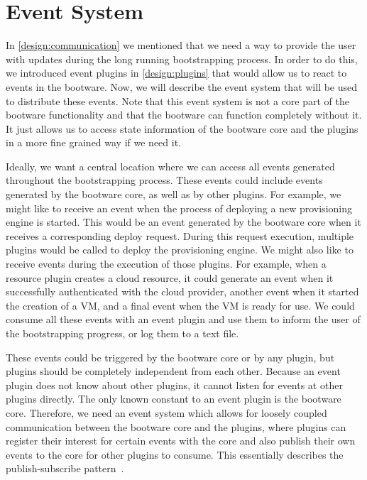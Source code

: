 \section{Event System}
\label{design:internalcomm}

In \autoref{design:communication} we mentioned that we need a way to provide the user with updates during the long running bootstrapping process.
In order to do this, we introduced event plugins in \autoref{design:plugins} that would allow us to react to events in the bootware.
Now, we will describe the event system that will be used to distribute these events.
Note that this event system is not a core part of the bootware functionality and that the bootware can function completely without it.
It just allows us to access state information of the bootware core and the plugins in a more fine grained way if we need it.

Ideally, we want a central location where we can access all events generated throughout the bootstrapping process.
These events could include events generated by the bootware core, as well as by other plugins.
For example, we might like to receive an event when the process of deploying a new provisioning engine is started.
This would be an event generated by the bootware core when it receives a corresponding deploy request.
During this request execution, multiple plugins would be called to deploy the provisioning engine.
We might also like to receive events during the execution of those plugins.
For example, when a resource plugin creates a cloud resource, it could generate an event when it successfully authenticated with the cloud provider, another event when it started the creation of a VM, and a final event when the VM is ready for use.
We could consume all these events with an event plugin and use them to inform the user of the bootstrapping progress, or log them to a text file.

These events could be triggered by the bootware core or by any plugin, but plugins should be completely independent from each other.
Because an event plugin does not know about other plugins, it cannot listen for events at other plugins directly.
The only known constant to an event plugin is the bootware core.
Therefore, we need an event system which allows for loosely coupled communication between the bootware core and the plugins, where plugins can register their interest for certain events with the core and also publish their own events to the core for other plugins to consume.
This essentially describes the publish-subscribe pattern~\autocite{pubsub}.

